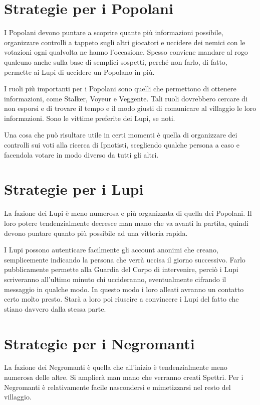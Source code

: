\documentclass[a4paper,10pt]{article}
\begin{document}
\section{Strategie per i Popolani}

I Popolani devono puntare a scoprire quante più informazioni possibile, organizzare controlli a tappeto sugli altri giocatori e uccidere dei nemici con le votazioni ogni qualvolta ne hanno l'occasione. Spesso conviene mandare al rogo qualcuno anche sulla base di semplici sospetti, perché non farlo, di fatto, permette ai Lupi di uccidere un Popolano in più.

I ruoli più importanti per i Popolani sono quelli che permettono di ottenere informazioni, come Stalker, Voyeur e Veggente. Tali ruoli dovrebbero cercare di non esporsi e di trovare il tempo e il modo giusti di comunicare al villaggio le loro informazioni. Sono le vittime preferite dei Lupi, se noti.

Una cosa che può risultare utile in certi momenti è quella di organizzare dei controlli sui voti alla ricerca di Ipnotisti, scegliendo qualche persona a caso e facendola votare in modo diverso da tutti gli altri.

\section{Strategie per i Lupi}

La fazione dei Lupi è meno numerosa e più organizzata di quella dei Popolani. Il loro potere tendenzialmente decresce man mano che va avanti la partita, quindi devono puntare quanto più possibile ad una vittoria rapida.

I Lupi possono autenticare facilmente gli account anonimi che creano, semplicemente indicando la persona che verrà uccisa il giorno successivo. Farlo pubblicamente permette alla Guardia del Corpo di intervenire, perciò i Lupi scriveranno all'ultimo minuto chi uccideranno, eventualmente cifrando il messaggio in qualche modo. In questo modo i loro alleati avranno un contatto certo molto presto. Starà a loro poi riuscire a convincere i Lupi del fatto che stiano davvero dalla stessa parte.

\section{Strategie per i Negromanti}

La fazione dei Negromanti è quella che all'inizio è tendenzialmente meno numerosa delle altre. Si amplierà man mano che verranno creati Spettri. Per i Negromanti è relativamente facile nascondersi e mimetizzarsi nel resto del villaggio.
\end{document}
